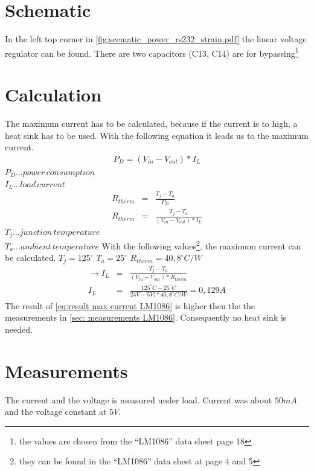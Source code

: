 \documentclass[a4paper,12pt]{scrreprt}
\begin{document}
\section{Schematic}

In the left top corner in \autoref{fig:scematic_power_rs232_strain.pdf} the linear voltage regulator can be found. There are two capacitors (C13, C14) are for bypassing\footnote{the values are chosen from the \enquote{LM1086} data sheet page 18}

\section{Calculation}

The maximum current has to be calculated, because if the current is to high, a heat sink has to be used.
With the following equation it leads us to the maximum current.
\begin{eqnarray}
P_{D}=(V_{in}-V_{out})*I_{L}
\end{eqnarray}
$P_{D}...power \, consumption$\\
$I_{L}...load \, current$
\begin{eqnarray}
R_{therm} &=& \frac{T_{j}-T_{a}}{P_{D}}\\
R_{therm} &=&  \frac{T_{j}-T_{a}}{(V_{in}-V_{out})*I_{L}}
\end{eqnarray}
$T_{j}...junction \, temperature$\\
$T_{a}...ambient \, temperature$
With the following values\footnote{they can be found in the \enquote{LM1086} data sheet at page 4 and 5}, the maximum current can be calculated.
$T_{j}=125^{\circ}$
$T_{a}=25^{\circ}$
$R_{therm}=40,8^{\circ}C/W$
\begin{eqnarray}
\rightarrow I_{L} &=&  \frac{T_{j}-T_{a}}{(V_{in}-V_{out})*R_{therm}}\\
I_{L} &=&  \frac{125^{\circ}C-25^{\circ}C}{24V-5V)*40,8^{\circ}C/W}=0,129A\label{eq:result max current LM1086}
\end{eqnarray}
The result of \autoref{eq:result max current LM1086} is higher then the the measurements in \autoref{sec: measurements LM1086}. Consequently no heat sink is needed.

\section{Measurements}\label{sec: measurements LM1086}
The current and the voltage is measured under load. Current was about $50mA$ and the voltage constant at $5V$.
\end{document}
